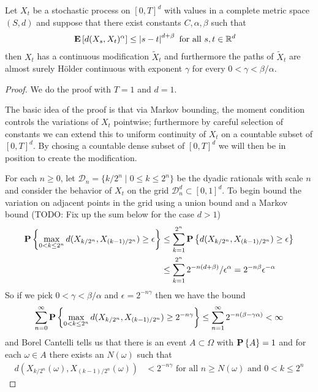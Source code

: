 \begin{thm}Let $X_t$ be a stochastic process on
  $[0,T]^d$ with values in a complete metric space $(S,d)$ and suppose
  that there exist constants $C, \alpha, \beta$ such that 
\begin{align*}
\textbf{E}\left[d(X_s, X_t)^\alpha\right] &\leq \left \vert s-t \right \vert^{d + \beta} \text{
  for all $s,t \in \mathbb{R}^d$}
\end{align*}
then $X_t$ has a continuous modification $\tilde{X}_t$ and furthermore
the paths of $\tilde{X}_t$ are almost surely H\"older continuous with
exponent $\gamma$ for every $0 < \gamma < \beta/\alpha$.
\end{thm}
\begin{proof}
We do the proof with $T=1$ and $d=1$.  

The basic idea of the proof is that via Markov bounding, the moment
condition controls the variations of $X_t$ pointwise; furthermore by careful
selection of constants we can extend this to uniform continuity of $X_t$ on a
countable subset of $[0,T]^d$.  By chosing a countable dense subset of
$[0,T]^d$ we will then be in position to create the modification.

For each $n \geq 0$, let $\mathcal{D}_n = \lbrace k/2^n \mid 0 \leq k
\leq 2^n \rbrace$ be the dyadic rationals with scale $n$ and consider
the behavior of $X_t$ on the grid $\mathcal{D}_n^d \subset [0,1]^d$.
To begin bound the variation on adjacent points in the grid using a
union bound and a Markov bound (TODO: Fix up the sum below for the
case $d>1$)
\begin{align*}
\textbf{P}\left \{\max_{0 < k \leq 2^n} d(X_{k/2^n}, X_{(k-1)/2^n}) \geq  \epsilon \right \}
&\leq \sum_{k=1}^{2^n} \textbf{P}\left \{d(X_{k/2^n}, X_{(k-1)/2^n}) \geq \epsilon \right \} \\
&\leq \sum_{k=1}^{2^n} 2^{-n(d+\beta)}/\epsilon^\alpha = 2^{-n\beta} \epsilon^{-\alpha}
\end{align*}
So if we pick $0 < \gamma < \beta/\alpha$ and $\epsilon=2^{-n\gamma}$
then we have the bound 
\begin{align*}
\sum_{n=0}^\infty \textbf{P}\left \{\max_{0 < k \leq 2^n} d(X_{k/2^n}, X_{(k-1)/2^n}) \geq
  2^{-n\gamma} \right \} \leq \sum_{n=1}^\infty  2^{-n(\beta - \gamma\alpha)} < \infty
\end{align*}
and Borel Cantelli tells us that there is an event $A \subset \Omega$
with $\textbf{P}\left \{A \right \}=1$ and for each $\omega \in A$ there exists an
$N(\omega)$ such that 
\begin{align*}
d(X_{k/2^n}(\omega),
X_{(k-1)/2^n}(\omega)) &< 2^{-n\gamma} \text{ for all $n \geq
  N(\omega)$ and $0 < k \leq 2^n$}
\end{align*}


\end{proof}
